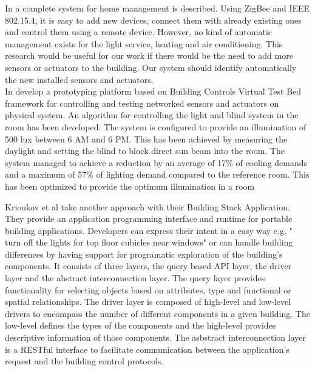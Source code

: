 In \cite{Han10} a complete system for home management is described. Using ZigBee and IEEE 802.15.4, it is easy to add new devices, connect them with already existing ones and control them using a remote device. However, no kind of automatic management exists for the light service, heating and air conditioning. This research would be useful for our work if there would be the need to add more sensors or actuators to the building. Our system should identify automatically the new installed sensors and actuators. 
\\In \cite{Wen11} develop a prototyping platform based on Building Controls Virtual Test Bed framework \cite{Bcvtb} for controlling and testing networked sensors and actuators on physical system. An algorithm for controlling the light and blind system in the room has been developed. The system is configured to provide an illumination of 500 lux between 6 AM and 6 PM. This has been achieved by measuring the daylight and setting the blind to block direct sun beam into the room. The system managed to achieve a reduction by an average of 17\% of cooling demands and a maximum of 57\% of lighting demand compared to the reference room. This has been optimized to provide the optimum illumination in a room 

Krioukov et al \cite{Krioukov12} take another approach with their Building Stack Application. They provide an application programming interface and runtime for portable building applications. Developers can express their intent in a easy way e.g. " turn off the lights
for top floor cubicles near windows" or can handle building differences by having support for programatic exploration of the building's components. It consists of three layers, the query based API layer, the driver layer and the abstract interconnection layer. 
The query layer provides functionality for selecting objects based on attributes, type and functional or spatial relationships. The driver layer is composed of high-level and low-level drivers to encompass the number of different components in a given building. The low-level defines the types of the components and the high-level provides descriptive information of those components. The asbstract interconnection layer is a RESTful interface to facilitate communication between the application's request and the building control protocols. 
